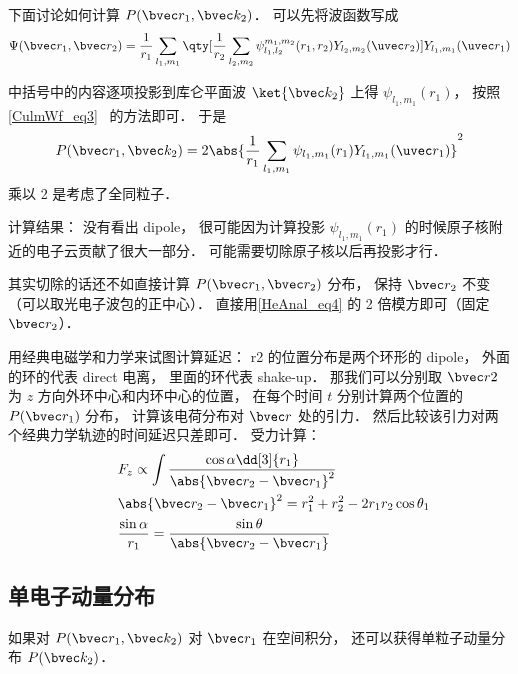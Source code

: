 下面讨论如何计算 $P(\bvec r_1, \bvec k_2)$． 可以先将波函数写成
\begin{equation}\label{HeAnal_eq4}
\Psi(\bvec r_1, \bvec r_2) = \frac{1}{r_1}\sum_{l_1,m_1} \qty[\frac{1}{r_2}\sum_{l_2,m_2} \psi_{l_1,l_2}^{m_1,m_2}(r_1, r_2) Y_{l_2,m_2}(\uvec r_2)] Y_{l_1,m_1}(\uvec r_1)
\end{equation}

中括号中的内容逐项投影到库仑平面波 $\ket{\bvec k_2}$ 上得 $\psi_{l_1,m_1}(r_1)$， 按照\autoref{CulmWf_eq3}~ 的方法即可． 于是
\begin{equation}\label{HeAnal_eq1}
P(\bvec r_1, \bvec k_2) = 2\abs{\frac{1}{r_1}\sum_{l_1,m_1} \psi_{l_1,m_1}(r_1) Y_{l_1,m_1}(\uvec r_1)}^2
\end{equation}
乘以 2 是考虑了全同粒子．

计算结果： 没有看出 dipole， 很可能因为计算投影 $\psi_{l_1,m_1}(r_1)$ 的时候原子核附近的电子云贡献了很大一部分． 可能需要切除原子核以后再投影才行．

其实切除的话还不如直接计算 $P(\bvec r_1, \bvec r_2)$ 分布， 保持 $\bvec r_2$ 不变（可以取光电子波包的正中心）． 直接用\autoref{HeAnal_eq4} 的 2 倍模方即可（固定 $\bvec r_2$）．

用经典电磁学和力学来试图计算延迟： r2 的位置分布是两个环形的 dipole， 外面的环的代表 direct 电离， 里面的环代表 shake-up． 那我们可以分别取 $\bvec r2$ 为 $z$ 方向外环中心和内环中心的位置， 在每个时间 $t$ 分别计算两个位置的 $P(\bvec r_1)$ 分布， 计算该电荷分布对 $\bvec r$ 处的引力． 然后比较该引力对两个经典力学轨迹的时间延迟只差即可． 受力计算：
\begin{equation}
\begin{aligned}
&F_z \propto \int \frac{\cos\alpha\dd[3]{r_1}}{\abs{\bvec r_2 - \bvec r_1}^2}\\
\qquad
&\abs{\bvec r_2 - \bvec r_1}^2 = r_1^2 + r_2^2 - 2r_1r_2 \cos\theta_1\\
&\frac{\sin\alpha}{r_1} = \frac{\sin\theta}{\abs{\bvec r_2 - \bvec r_1}}
\end{aligned}
\end{equation}

\subsection{单电子动量分布}
如果对 $P(\bvec r_1, \bvec k_2)$ 对 $\bvec r_1$ 在空间积分， 还可以获得单粒子动量分布 $P(\bvec k_2)$．

